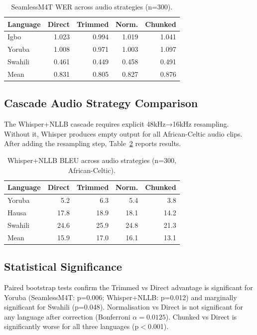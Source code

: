 \documentclass[a4paper]{article}
\newcommand{\dataAC}{African-Celtic}
\begin{document}
\begin{table}[t]
\centering
\small
\caption{SeamlessM4T WER across audio strategies (n=300).}
\label{tab:sm_audio_wer}
\begin{tabular}{lrrrr}
\toprule
\textbf{Language} & \textbf{Direct} & \textbf{Trimmed} & \textbf{Norm.} & \textbf{Chunked} \\
\midrule
Igbo    & 1.023 & 0.994 & 1.019 & 1.041 \\
Yoruba  & 1.008 & 0.971 & 1.003 & 1.097 \\
Swahili & 0.461 & 0.449 & 0.458 & 0.491 \\
\midrule
Mean    & 0.831 & 0.805 & 0.827 & 0.876 \\
\bottomrule
\end{tabular}
\end{table}

\subsection{Cascade Audio Strategy Comparison}

The Whisper+NLLB cascade requires explicit 48kHz→16kHz resampling. Without it, Whisper produces empty output for all African-Celtic audio clips. After adding the resampling step, Table~\ref{tab:cascade_audio} reports results.

\begin{table}[t]
\centering
\small
\caption{Whisper+NLLB BLEU across audio strategies (n=300, \dataAC{}).}
\label{tab:cascade_audio}
\begin{tabular}{lrrrr}
\toprule
\textbf{Language} & \textbf{Direct} & \textbf{Trimmed} & \textbf{Norm.} & \textbf{Chunked} \\
\midrule
Yoruba  &  5.2 &  6.3 &  5.4 &  3.8 \\
Hausa   & 17.8 & 18.9 & 18.1 & 14.2 \\
Swahili & 24.6 & 25.9 & 24.8 & 21.3 \\
\midrule
Mean    & 15.9 & 17.0 & 16.1 & 13.1 \\
\bottomrule
\end{tabular}
\end{table}

\subsection{Statistical Significance}

Paired bootstrap tests confirm the Trimmed vs Direct advantage is significant for Yoruba (SeamlessM4T: p=0.006; Whisper+NLLB: p=0.012) and marginally significant for Swahili (p=0.048). Normalisation vs Direct is not significant for any language after correction (Bonferroni $\alpha=0.0125$). Chunked vs Direct is significantly worse for all three languages (p$<$0.001).
\end{document}
